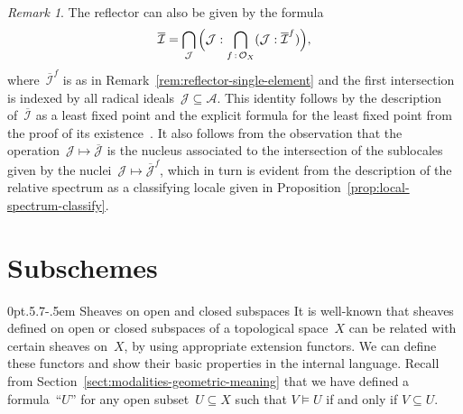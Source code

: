 \documentclass[10pt,reqno,a4paper]{amsbook}
\makeatletter
\theoremstyle{definition}
\theoremstyle{plain}
\theoremstyle{remark}
\newtheorem{rem}[defn]{Remark}
\newcommand{\A}{\mathcal{A}}
\renewcommand{\O}{\mathcal{O}}
\newcommand{\I}{\mathcal{I}}
\newcommand{\J}{\mathcal{J}}
\newcommand{\?}{\,{:}\,}
\renewcommand{\_}{\mathpunct{.}\,}
\def\subsection{\@startsection{subsection}{2}%
  {0pt}{.5\linespacing\@plus.7\linespacing}{-.5em}%
  {\normalfont\bfseries}}
\makeatother
\begin{document}
\begin{rem}The reflector can also be given by the formula
\[ \overline{\I} = \bigcap_\J\,
  \Bigl(\J : \bigcap_{f\?\O_X} (\J : \overline{\I}^f)\Bigr), \]
where~$\overline{\I}^f$ is as in Remark~\ref{rem:reflector-single-element} and
the first intersection is indexed by all radical ideals~$\J \subseteq \A$.
This identity follows by the description of~$\overline{\I}$ as a least fixed
point and the explicit formula for the least fixed point from the proof of its
existence~\cite{bauer:lumsdaine:bourbaki-witt}. It also follows from the
observation that the operation~$\J \mapsto \overline{\J}$ is the nucleus
associated to the intersection of the sublocales given by the nuclei~$\J
\mapsto \overline{\J}^f$, which in turn is evident from the description of the
relative spectrum as a classifying locale given in
Proposition~\ref{prop:local-spectrum-classify}.
\end{rem}



\section{Subschemes}

\subsection{Sheaves on open and closed subspaces} It is well-known that sheaves
defined on open or closed subspaces of a topological space~$X$ can be related
with certain sheaves on~$X$, by using appropriate extension functors. We can
define these functors and show their basic properties in the internal
language. Recall from Section~\ref{sect:modalities-geometric-meaning} that we
have defined a formula~``$U$'' for any open subset~$U \subseteq X$ such that
$V \models U$ if and only if $V \subseteq U$.
\end{document}
